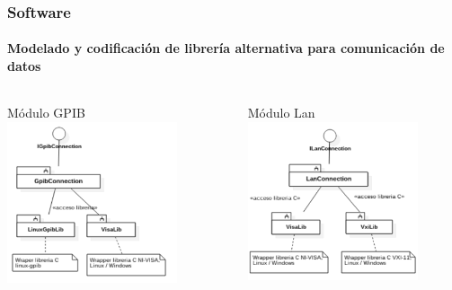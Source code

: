 \documentclass[xcolor=pdftext, table]{beamer}
\begin{document}
	\begin{frame}	
		\frametitle{Software}
		\framesubtitle{Modelado y codificación de librería alternativa para comunicación de datos}
		
		\begin{columns}
			
			\begin{column}{5cm}
				\begin{block}{Módulo GPIB}
					\includegraphics[width=5cm]{Imagenes/GpibConnectionPackageUml.pdf} 
				\end{block}			
			\end{column}
		
			\begin{column}{5cm}
				\begin{block}{Módulo Lan}
					\includegraphics[width=5cm]{Imagenes/LanConnectionPackageUml.pdf}
				\end{block}				
			\end{column}	
				
		\end{columns}		
	
	\end{frame}
\end{document}
